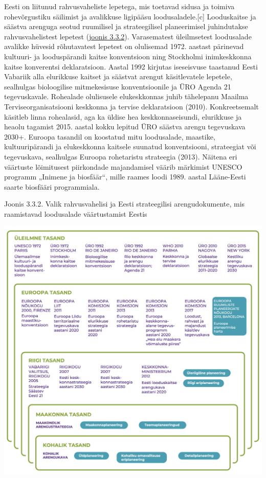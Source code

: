 \documentclass[estonian,]{article}
\begin{document}
Eesti on liitunud rahvusvaheliste lepetega, mis toetavad sidusa ja toimiva rohevõrgustiku säilimist ja avalikkuse ligipääsu loodusaladele.{[}c{]}
Looduskaitse ja säästva arenguga seotud ruumilisel ja strateegilisel planeerimisel juhindutakse rahvusvahelistest lepetest (\protect\hyperlink{figure332}{joonis 3.3.2}). Varasematest üleilmsetest loodusalade avalikke hüvesid rõhutavatest lepetest on olulisemad 1972. aastast pärinevad kultuuri- ja looduspärandi kaitse konventsioon ning Stockholmi inimkeskkonna kaitse konverentsi deklaratsioon. Aastal 1992 kirjutas iseseisvuse taastanud Eesti Vabariik alla elurikkuse kaitset ja säästvat arengut käsitlevatele lepetele, sealhulgas bioloogilise mitmekesisuse konventsioonile ja ÜRO Agenda 21 tegevuskavale. Rohealade olulisusele elukeskkonnas juhib tähelepanu Maailma Terviseorganisatsiooni keskkonna ja tervise deklaratsioon (2010). Konkreetsemalt käsitleb linna rohealasid, aga ka üldise hea keskkonnaseisundi, elurikkuse ja heaolu tagamist 2015. aastal kokku lepitud ÜRO säästva arengu tegevuskava 2030+. Euroopa tasandil on koostatud mitu loodusalade, maastike, kultuuripärandi ja elukeskkonna kaitsele suunatud konventsiooni, strateegiat või tegevuskava, sealhulgas Euroopa rohetaristu strateegia (2013). Näitena eri väärtuste lõimitusest piirkondade majandamisel väärib märkimist UNESCO programm „Inimene ja biosfäär``, mille raames loodi 1989. aastal Lääne-Eesti saarte biosfääri programmiala.

{Joonis 3.3.2.} Valik rahvusvahelisi ja Eesti strateegilisi arengudokumente, mis raamistavad loodusalade väärtustamist Eestis

\begin{center}\includegraphics[width=1\linewidth]{figures/3-chapter/fig332} \end{center}
\end{document}
